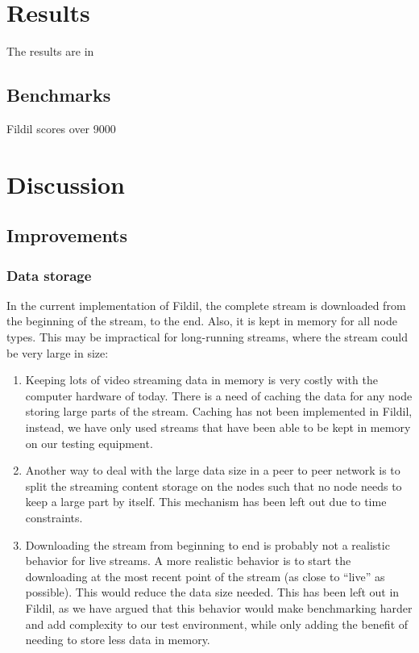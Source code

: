 \documentclass[10pt, a4paper]{article}
\begin{document}
\section{Results}
\label{sec:results}

The results are in

\subsection{Benchmarks}

Fildil scores over 9000

\section{Discussion}
\label{sec:discussion}

\subsection{Improvements}

\subsubsection{Data storage}
\label{sec:storage-improvements}

In the current implementation of Fildil, the complete stream is downloaded from
the beginning of the stream, to the end. Also, it is kept in memory for all node
types. This may be impractical for long-running streams, where the stream could
be very large in size:

\begin{enumerate}
\item Keeping lots of video streaming data in memory is very costly with the
  computer hardware of today. There is a need of caching the data for any node
  storing large parts of the stream. Caching has not been implemented in Fildil,
  instead, we have only used streams that have been able to be kept in memory on
  our testing equipment.
\item Another way to deal with the large data size in a peer to peer network is
  to split the streaming content storage on the nodes such that no node needs to
  keep a large part by itself. This mechanism has been left out due to time
  constraints. %
\item Downloading the stream from beginning to end is probably not a realistic
  behavior for live streams. A more realistic behavior is to start the
  downloading at the most recent point of the stream (as close to ``live'' as
  possible). This would reduce the data size needed. This has been left out in
  Fildil, as we have argued that this behavior would make benchmarking harder
  and add complexity to our test environment, while only adding the benefit of
  needing to store less data in memory.
\end{enumerate}

\newpage


\end{document}
